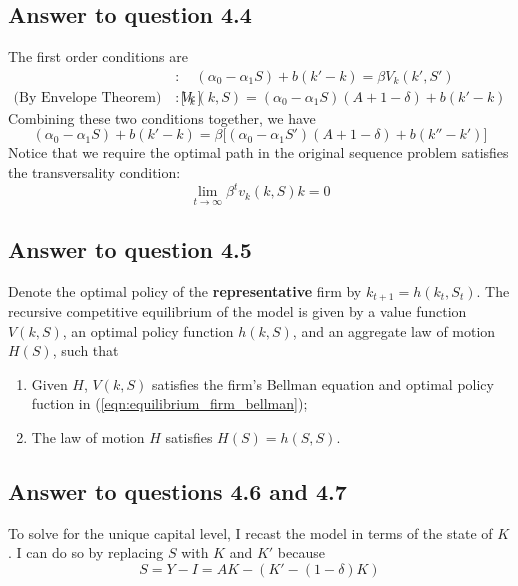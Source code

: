 \documentclass[11pt]{article}
\theoremstyle{definition}
\theoremstyle{boldtitle} %
\numberwithin{equation}{section}
\numberwithin{figure}{section}
\numberwithin{table}{section}
\begin{document}
\subsection*{Answer to question 4.4}
The first order conditions are 
\begin{align*}
[k']&: \quad (\alpha_0 - \alpha_1 S) + b (k' - k) = \beta V_k (k', S')\\ 
\text{(By Envelope Theorem) } \quad [k]&: V_k(k, S) = (\alpha_0 - \alpha_1 S) (A + 1 - \delta) + b(k' - k)
\end{align*}
Combining these two conditions together, we have 
\[
(\alpha_0 - \alpha_1 S) + b (k' - k) = \beta \bigg[  (\alpha_0 - \alpha_1 S') (A + 1 - \delta) + b(k''- k')\bigg]
\]
Notice that we require the optimal path in the original sequence problem satisfies the transversality condition:
\[
\lim_{t\rightarrow \infty} \beta^t v_k(k, S)k = 0
\]

\subsection*{Answer to question 4.5}
Denote the optimal policy of the \textbf{representative} firm by $k_{t+1} = h(k_t, S_t)$.
The recursive competitive equilibrium of the model is given by 
a value function $V(k, S)$, an optimal policy function $h(k, S)$, and an aggregate law of motion $H(S)$,
such that 
\begin{enumerate}
    \item Given $H$, $V(k, S)$ satisfies the firm's Bellman equation and optimal policy fuction in (\ref{eqn:equilibrium_firm_bellman});
    \item The law of motion $H$ satisfies $H(S) = h(S, S)$.
\end{enumerate}

\subsection*{Answer to questions 4.6 and 4.7}
To solve for the unique capital level, I recast the model in terms of the state of $K$.
I can do so by replacing $S$ with $K$ and $K'$ because
\[
S = Y - I = AK - (K' - (1 - \delta)K)
\]
\end{document}
